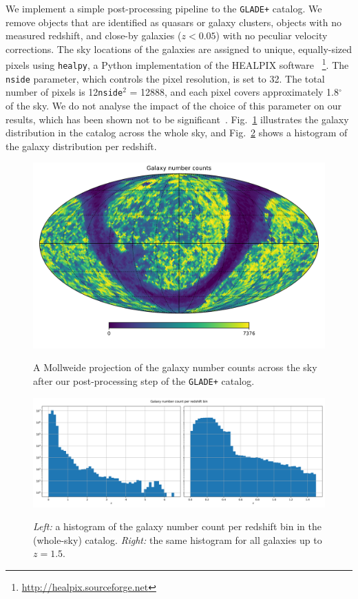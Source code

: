 \documentclass[%
preprint,
nofootinbib,
 amsmath,amssymb,
 aps,
]{revtex4-2}
\begin{document}
We implement a simple post-processing pipeline to the \texttt{GLADE+} catalog. We remove objects
that are identified as quasars or galaxy clusters, objects with no measured redshift, and close-by
galaxies ($z<0.05$) with no peculiar velocity corrections. The sky locations of the galaxies are
assigned to unique, equally-sized pixels using \texttt{healpy}, a Python implementation of the
HEALPIX software~\cite{2005ApJ...622..759G,Zonca2019}
\footnote{\url{http://healpix.sourceforge.net}}. The \texttt{nside} parameter, which controls the
pixel resolution, is set to 32. The total number of pixels is 12\texttt{nside}$^2$ = 12888, and
each pixel covers approximately 1.8$^{\circ}$ of the sky. We do not analyse the impact of the
choice of this parameter on our results, which has been shown not to be
significant~\cite{Gray_2022}. Fig.~\ref{fig:galaxy-map} illustrates the galaxy distribution in the
catalog across the whole sky, and Fig.~\ref{fig:galaxy-redshift-distribution} shows a histogram of
the galaxy distribution per redshift.

\begin{figure}[!ht]
	\caption{A Mollweide projection of the galaxy number counts across the sky after our post-processing step of the \texttt{GLADE+} catalog.}
	\centering
	\includegraphics[width=\textwidth]{../src/figures/galaxy-map.png}
	\label{fig:galaxy-map}
\end{figure}

\begin{figure}[!ht]
	\caption{\textit{Left:} a histogram of the galaxy number count per redshift bin in the (whole-sky) catalog. \textit{Right:} the same histogram for all galaxies up to $z=1.5$.}
	\centering
	\includegraphics[width=\textwidth]{../src/figures/galaxy-redshift-distribution.png}
	\label{fig:galaxy-redshift-distribution}
\end{figure}
\end{document}
